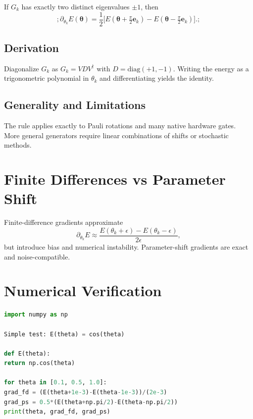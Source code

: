 \documentclass{book}
\begin{document}
If $G_k$ has exactly two distinct eigenvalues $\pm 1$, then
\begin{equation}
\boxed{;\partial_{\theta_k} E(\bm\theta) = \frac{1}{2} \Big[ E(\bm\theta + \tfrac{\pi}{2} \mathbf{e}_k) - E(\bm\theta - \tfrac{\pi}{2} \mathbf{e}_k) \Big].;}
\end{equation}

\subsection{Derivation}

Diagonalize $G_k$ as $G_k = V D V^\dagger$ with $D = \mathrm{diag}(+1,-1)$. Writing the energy as a trigonometric polynomial in $\theta_k$ and differentiating yields the identity.

\subsection{Generality and Limitations}

The rule applies exactly to Pauli rotations and many native hardware gates. More general generators require linear combinations of shifts or stochastic methods.

\section{Finite Differences vs Parameter Shift}

Finite-difference gradients approximate
\begin{equation}
\partial_{\theta_k} E \approx \frac{E(\theta_k + \epsilon) - E(\theta_k - \epsilon)}{2\epsilon},
\end{equation}
but introduce bias and numerical instability. Parameter-shift gradients are exact and noise-compatible.

\section{Numerical Verification}

\begin{lstlisting}[language=Python]
import numpy as np

Simple test: E(theta) = cos(theta)

def E(theta):
return np.cos(theta)

for theta in [0.1, 0.5, 1.0]:
grad_fd = (E(theta+1e-3)-E(theta-1e-3))/(2e-3)
grad_ps = 0.5*(E(theta+np.pi/2)-E(theta-np.pi/2))
print(theta, grad_fd, grad_ps)
\end{lstlisting}
\end{document}
